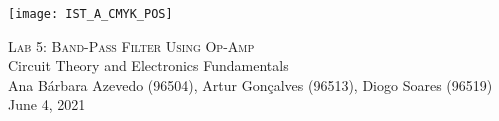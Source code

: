 
\thispagestyle {empty}

\texttt{[image: IST\_A\_CMYK\_POS]}

\begin{center}
%
\vspace{1.0cm}

\vspace{3cm}
\textsc{\Huge Lab 5: Band-Pass Filter Using Op-Amp}\\
\vspace{0.5cm}
{\Large Circuit Theory and Electronics Fundamentals} \\
\vspace{0.8cm}
{\normalsize Ana Bárbara Azevedo (96504), Artur Gonçalves (96513), Diogo Soares (96519)} \\

\vspace{0.5cm}
{June 4, 2021}\\
\end{center}
\vspace{2.5cm}

